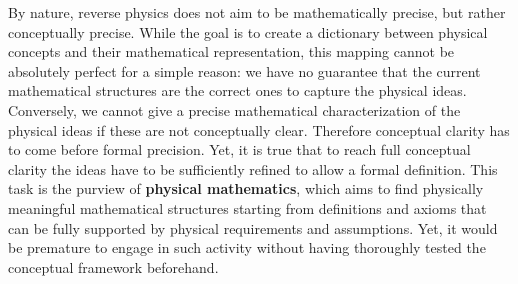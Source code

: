 By nature, reverse physics does not aim to be mathematically precise, but rather conceptually precise. While the goal is to create a dictionary between physical concepts and their mathematical representation, this mapping cannot be absolutely perfect for a simple reason: we have no guarantee that the current mathematical structures are the correct ones to capture the physical ideas. Conversely, we cannot give a precise mathematical characterization of the physical ideas if these are not conceptually clear. Therefore conceptual clarity has to come before formal precision. Yet, it is true that to reach full conceptual clarity the ideas have to be sufficiently refined to allow a formal definition. This task is the purview of \textbf{physical mathematics}, which aims to find physically meaningful mathematical structures starting from definitions and axioms that can be fully supported by physical requirements and assumptions. Yet, it would be premature to engage in such activity without having thoroughly tested the conceptual framework beforehand.

